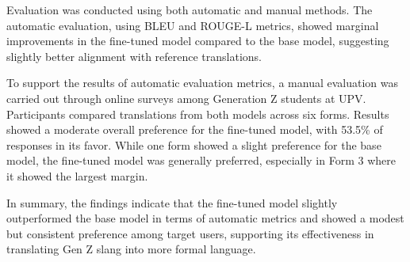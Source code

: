 Evaluation was conducted using both automatic and manual methods. The automatic evaluation, using BLEU and ROUGE-L metrics, showed marginal improvements in the fine-tuned model compared to the base model, suggesting slightly better alignment with reference translations. 

To support the results of automatic evaluation metrics, a manual evaluation was carried out through online surveys among Generation Z students at UPV. Participants compared translations from both models across six forms. Results showed a moderate overall preference for the fine-tuned model, with 53.5\% of responses in its favor. While one form showed a slight preference for the base model, the fine-tuned model was generally preferred, especially in Form 3 where it showed the largest margin.

In summary, the findings indicate that the fine-tuned model slightly outperformed the base model in terms of automatic metrics and showed a modest but consistent preference among target users, supporting its effectiveness in translating Gen Z slang into more formal language.